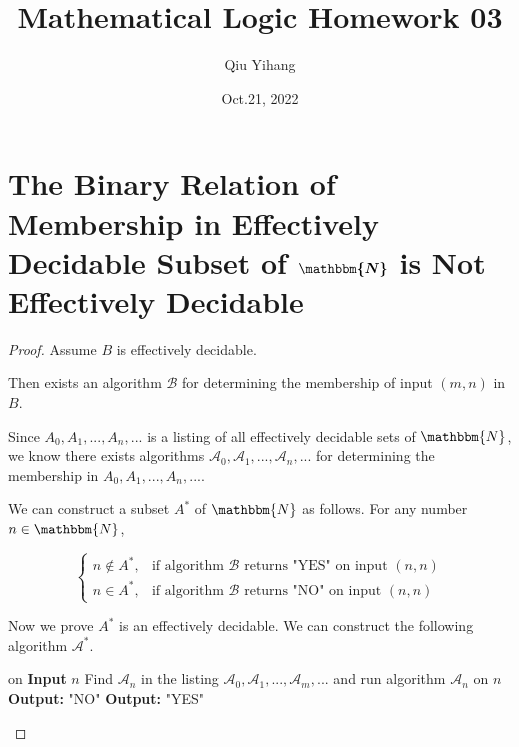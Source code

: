 \documentclass{article}
\title{\textbf{Mathematical Logic Homework 03}}
\author{Qiu Yihang}
\date{Oct.21, 2022}
\begin{document}
\maketitle

\vspace{2.2em}
\section{The Binary Relation of Membership in Effectively Decidable Subset of $\boldsymbol{\mathbbm{N}}$ is Not Effectively Decidable}
\vspace{1em}
\begin{proof}
    Assume $B$ is effectively decidable.
    
    \hspace{1.3em}
    Then exists an algorithm $\mathcal{B}$ for determining the membership of input $(m,n)$ in $B$.

    \hspace{1.3em}
    Since $A_0,A_1,...,A_n,...$ is a listing of all effectively decidable sets of $\mathbbm{N}$, we know there exists algorithms $\mathcal{A}_0, \mathcal{A}_1,...,\mathcal{A}_n,...$ for determining the membership in $A_0,A_1,...,A_n,...$. 
    
    \hspace{1.3em}
    We can construct a subset $A^*$ of $\mathbbm{N}$ as follows. For any number $n\in\mathbbm{N}$, 

    \vspace{-1.2em}
    $$
    \left\{
        \begin{array}{rl}
            n\notin A^*, & \text{if algorithm }\mathcal{B}\text{ returns "YES" on input }(n,n) \\
            n\in A^*, & \text{if algorithm }\mathcal{B}\text{ returns "NO" on input }(n,n)
        \end{array}
    \right.
    $$

    \hspace{1.3em}
    Now we prove $A^*$ is an effectively decidable. We can construct the following algorithm $\mathcal{A}^*$.
    
    \vspace{-1em}
    \begin{algorithm}
        
	    {
        on \textbf{Input} $n$\;
        Find $\mathcal{A}_n$ in the listing $\mathcal{A}_0,\mathcal{A}_1,...,\mathcal{A}_m,...$ and run algorithm $\mathcal{A}_n$ on $n$\;
        {\quad\textbf{Output: }"NO"\quad}
        {\quad\textbf{Output: }"YES"}
        }
    \end{algorithm}


\end{proof}
\end{document}
